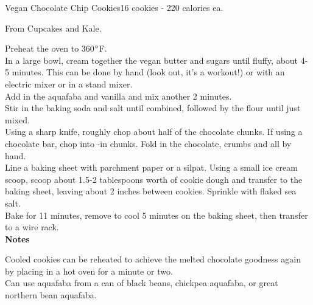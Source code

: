 \begin{recipe}{Vegan Chocolate Chip Cookies}{16 cookies - 220 calories ea.}{}

\freeform From Cupcakes and Kale.


Preheat the oven to 360$\degree$F.\\

In a large bowl, cream together the vegan butter and sugars until fluffy, about 4-5 minutes. This can be done by hand (look out, it's a workout!) or with an electric mixer or in a stand mixer.\\

Add in the aquafaba and vanilla and mix another 2 minutes.\\

Stir in the baking soda and salt until combined, followed by the flour until just mixed.\\

Using a sharp knife, roughly chop about half of the chocolate chunks. If using a chocolate bar, chop into -in chunks. Fold in the chocolate, crumbs and all by hand.\\

Line a baking sheet with parchment paper or a silpat. Using a small ice cream scoop, scoop about 1.5-2 tablespoons worth of cookie dough and transfer to the baking sheet, leaving about 2 inches between cookies. Sprinkle with flaked sea salt.\\

Bake for 11 minutes, remove to cool 5 minutes on the baking sheet, then transfer to a wire rack.\\

\textbf{Notes}

Cooled cookies can be reheated to achieve the melted chocolate goodness again by placing in a hot oven for a minute or two.\\

Can use aquafaba from a can of black beans, chickpea aquafaba, or great northern bean aquafaba.

\end{recipe}